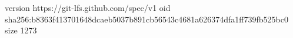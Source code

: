 version https://git-lfs.github.com/spec/v1
oid sha256:b8363f413701648dcaeb5037b891cb56543c4681a626374dfa1ff739fb525bc0
size 1273
